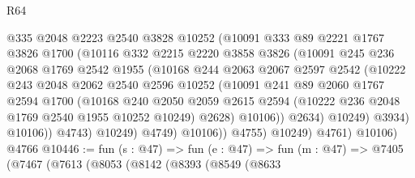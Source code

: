 \begin{lexlean}{R64}
\begin{coremodule}
                        @335
                        @2048
                        @2223
                        @2540
                        @3828
                        @10252
                        (@10091
                          @333
                          @89
                          @2221
                          @1767
                          @3826
                          @1700
                          (@10116
                            @332
                            @2215
                            @2220
                            @3858
                            @3826
                            (@10091
                              @245
                              @236
                              @2068
                              @1769
                              @2542
                              @1955
                              (@10168
                                @244
                                @2063
                                @2067
                                @2597
                                @2542
                                (@10222
                                  @243
                                  @2048
                                  @2062
                                  @2540
                                  @2596
                                  @10252
                                  (@10091
                                    @241
                                    @89
                                    @2060
                                    @1767
                                    @2594
                                    @1700
                                    (@10168
                                      @240
                                      @2050
                                      @2059
                                      @2615
                                      @2594
                                      (@10222 @236 @2048 @1769 @2540 @1955 @10252 @10249)
                                      @2628)
                                    @10106))
                                @2634)
                              @10249)
                            @3934)
                          @10106))
                      @4743)
                    @10249)
                  @4749)
                @10106))
            @4755)
          @10249)
        @4761)
      @10106)
    @4766
@10446 := fun (s : @47) =>
  fun (e : @47) =>
  fun (m : @47) =>
  @7405
    (@7467
      (@7613
        (@8053
          (@8142
            (@8393
              (@8549
                (@8633

\end{coremodule}
\end{lexlean}

